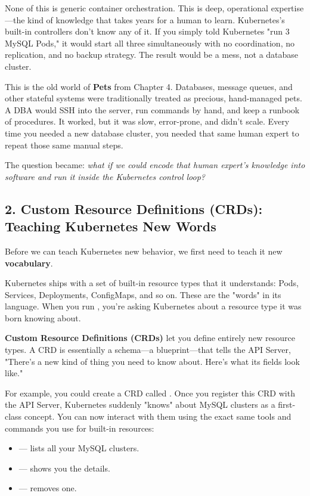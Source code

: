 None of this is generic container orchestration. This is deep, operational expertise---the kind of knowledge that takes years for a human to learn. Kubernetes's built-in controllers don't know any of it. If you simply told Kubernetes "run 3 MySQL Pods," it would start all three simultaneously with no coordination, no replication, and no backup strategy. The result would be a mess, not a database cluster.

This is the old world of \textbf{Pets} from Chapter 4. Databases, message queues, and other stateful systems were traditionally treated as precious, hand-managed pets. A DBA would SSH into the server, run commands by hand, and keep a runbook of procedures. It worked, but it was slow, error-prone, and didn't scale. Every time you needed a new database cluster, you needed that same human expert to repeat those same manual steps.

The question became: \textit{what if we could encode that human expert's knowledge into software and run it inside the Kubernetes control loop?}


\subsection{2. Custom Resource Definitions (CRDs): Teaching Kubernetes New Words}


Before we can teach Kubernetes new behavior, we first need to teach it new \textbf{vocabulary}.

Kubernetes ships with a set of built-in resource types that it understands: Pods, Services, Deployments, ConfigMaps, and so on. These are the "words" in its language. When you run , you're asking Kubernetes about a resource type it was born knowing about.

\textbf{Custom Resource Definitions (CRDs)} let you define entirely new resource types. A CRD is essentially a schema---a blueprint---that tells the API Server, "There's a new kind of thing you need to know about. Here's what its fields look like."

For example, you could create a CRD called . Once you register this CRD with the API Server, Kubernetes suddenly "knows" about MySQL clusters as a first-class concept. You can now interact with them using the exact same tools and commands you use for built-in resources:

\begin{itemize}
\item {} --- lists all your MySQL clusters.
\item {} --- shows you the details.
\item {} --- removes one.
\end{itemize}

